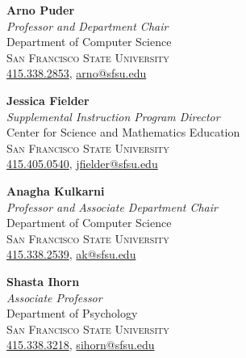\documentclass[hidelinks, 10.5pt]{article}
\newcommand{\contentwidth}{0.9\linewidth}
\begin{document}
{\begin{minipage}[ct]{\contentwidth}
\begin{multicols}{2}
        \vspace{-1mm}

        \textbf{Arno Puder}\\
        \emph{Professor and Department Chair}\\
        {Department of Computer Science}\\
        \textsc{San Francisco State University}\\
        \href{tel:4153382853}{415.338.2853}, \href{mailto:arno@sfsu.edu}{arno@sfsu.edu}\\

        \vspace{-1mm}

        \textbf{Jessica Fielder}\\
        \emph{Supplemental Instruction Program Director}\\
        {Center for Science and Mathematics Education}\\
        \textsc{San Francisco State University}\\
        \href{tel:4154050540}{415.405.0540}, \href{mailto:jfielder@sfsu.edu}{jfielder@sfsu.edu}\\

        \columnbreak

        \textbf{Anagha Kulkarni}\\
        \emph{Professor and Associate Department Chair}\\
        {Department of Computer Science}\\
        \textsc{San Francisco State University}\\
        \href{tel:4153382539}{415.338.2539}, \href{mailto:ak@sfsu.edu}{ak@sfsu.edu}\\

        \vspace{-1mm}

        \textbf{Shasta Ihorn}\\
        \emph{Associate Professor}\\
        {Department of Psychology}\\
        \textsc{San Francisco State University}\\
        \href{tel:4153383218}{415.338.3218}, \href{mailto:sihorn@sfsu.edu}{sihorn@sfsu.edu}\\
    \end{multicols}
\end{minipage}


}
\end{document}
